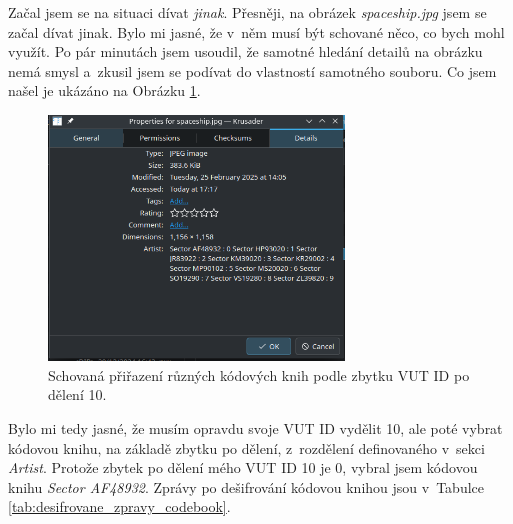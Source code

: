 \documentclass[a4paper, 11pt]{article}
\begin{document}
Začal jsem se na situaci dívat \emph{jinak}.
Přesněji, na obrázek \emph{spaceship.jpg} jsem se začal dívat jinak.
Bylo mi jasné, že v~něm musí být schované něco, co bych mohl využít.
Po pár minutách jsem usoudil, že samotné hledání detailů na obrázku nemá smysl a~zkusil jsem se podívat do vlastností samotného souboru.
Co jsem našel je ukázáno na Obrázku \ref{fig:prirazeni_kodovych_knih}.

\begin{figure}[t]
    \centering
    \includegraphics[width=0.7\textwidth]{img/hidden_codebook_sectors.png}
    \caption{Schovaná přiřazení různých kódových knih podle zbytku VUT ID po dělení 10.}
    \label{fig:prirazeni_kodovych_knih}
\end{figure}

Bylo mi tedy jasné, že musím opravdu svoje VUT ID vydělit 10, ale poté vybrat kódovou knihu, na základě zbytku po dělení, z~rozdělení definovaného v~sekci \emph{Artist}.
Protože zbytek po dělení mého VUT ID 10 je 0, vybral jsem kódovou knihu \emph{Sector AF48932}.
Zprávy po dešifrování kódovou knihou jsou v~Tabulce \ref{tab:desifrovane_zpravy_codebook}.
\end{document}
